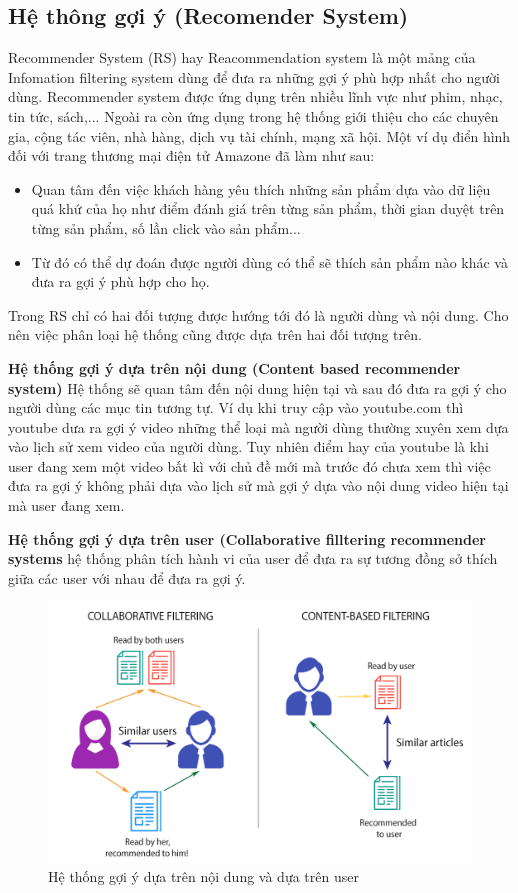 \subsection{Hệ thông gợi ý (Recomender System)}
Recommender System (RS) hay Reacommendation system là một mảng của Infomation filtering system dùng để đưa ra những gợi ý phù hợp nhất cho người dùng. Recommender system được ứng dụng trên nhiều lĩnh vực như phim, nhạc, tin tức, sách,... Ngoài ra còn ứng dụng trong hệ thống giới thiệu cho các chuyên gia, cộng tác viên, nhà hàng, dịch vụ tài chính, mạng xã hội.
Một ví dụ điển hình đối với trang thương mại điện tử Amazone đã làm như sau:
\begin{itemize}
    \item Quan tâm đến việc khách hàng yêu thích những sản phẩm dựa vào dữ liệu quá khứ của họ như điểm đánh giá trên từng sản phẩm, thời gian duyệt trên từng sản phẩm, số lần click vào sản phẩm...
    \item Từ đó có thể dự đoán được người dùng có thể sẽ thích sản phẩm nào khác và đưa ra gợi ý phù hợp cho họ.
\end{itemize}

Trong RS chỉ có hai đối tượng được hướng tới đó là người dùng và nội dung. Cho nên việc phân loại hệ thống cũng được dựa trên hai đối tượng trên.

\textbf{Hệ thống gợi ý dựa trên nội dung (Content based recommender system)} Hệ thống sẽ quan tâm đến nội dung hiện tại và sau đó  đưa ra gợi ý cho người dùng các mục tin tương tự. Ví dụ khi truy cập vào youtube.com thì youtube dưa ra gợi ý video những thể loại mà người dùng thường xuyên xem dựa vào lịch sử xem video của người dùng. Tuy nhiên điểm hay của youtube là khi user đang xem một video bất kì với chủ đề mới mà trước đó chưa xem thì việc đưa ra gợi ý không phải dựa vào lịch sử mà gợi ý dựa vào nội dung video hiện tại mà user đang xem.

\textbf{Hệ thống gợi ý dựa trên user (Collaborative filltering recommender systems} hệ thống phân tích hành vi của user để đưa ra sự tương đồng sở thích giữa các user với nhau để đưa ra gợi ý.

\begin{figure}[h]
\centering
\includegraphics[width=13cm]{image/Collaborative-Filtering-min.png}
\caption{Hệ thống gợi ý dựa trên nội dung và dựa trên user}
\end{figure}

